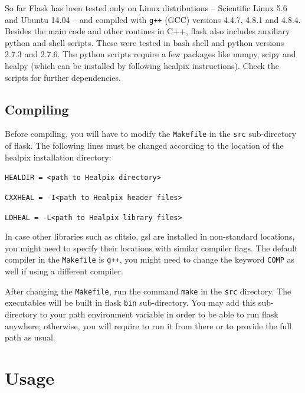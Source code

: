 \documentclass[12pt]{book} %
\begin{document}
So far {\sc Flask} has been tested only on Linux distributions -- Scientific Linux 5.6 and Ubuntu 14.04 -- 
and compiled with {\tt g++} (GCC) versions 4.4.7, 4.8.1 and 4.8.4.   
Besides the main code and other routines in {\sc C++}, {\sc flask} also includes auxiliary {\sc python} 
and {\sc shell} scripts. These were tested in {\sc bash} shell and {\sc python} versions 2.7.3 and 2.7.6. 
The {\sc python} scripts require a few packages like {\sc numpy}, {\sc scipy} and {\sc healpy} 
(which can be installed by following {\sc healpix} instructions). Check the scripts for further dependencies.  

\section{Compiling}
\label{sec:compiling}

Before compiling, you will have to modify the {\tt Makefile} in the {\tt src} sub-directory of {\sc flask}. 
The following lines must be changed according to the location of the {\sc healpix} installation directory:

\vspace{0.5cm}

\noindent
{\tt HEALDIR = <path to Healpix directory>}

\noindent
{\tt CXXHEAL = -I<path to Healpix header files>}

\noindent
{\tt LDHEAL  = -L<path to Healpix library files>} 
\vspace{0.5cm}

\noindent
In case other libraries such as {\sc cfitsio}, {\sc gsl} are installed in non-standard locations, 
you might need to specify their locations with similar compiler flags. The default compiler in the 
{\tt Makefile} is {\tt g++}, you might need to change the keyword {\tt COMP} as well if using a 
different compiler.

After changing the {\tt Makefile}, run the command {\tt make} in the {\tt src} directory. The 
executables will be built in {\sc flask} {\tt bin} sub-directory. You may add this sub-directory to 
your {\sc path} environment variable in order to be able to run {\sc flask} anywhere; otherwise, 
you will require to run it from there or to provide the full path as usual. 


\chapter{Usage}
\label{sec:usage}
\end{document}
